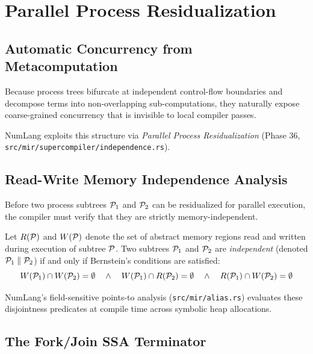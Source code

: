 \chapter{Parallel Process Residualization}
\label{chap:parallel}

\section{Automatic Concurrency from Metacomputation}
\label{sec:parallel:intro}

Because process trees bifurcate at independent control-flow boundaries and decompose terms into non-overlapping sub-computations, they naturally expose coarse-grained concurrency that is invisible to local compiler passes.

NumLang exploits this structure via \emph{Parallel Process Residualization} (Phase 36, \texttt{src/mir/supercompiler/independence.rs}).

\section{Read-Write Memory Independence Analysis}
\label{sec:parallel:independence}

Before two process subtrees $\mathcal{P}_1$ and $\mathcal{P}_2$ can be residualized for parallel execution, the compiler must verify that they are strictly memory-independent.

\begin{definition}
Let $R(\mathcal{P})$ and $W(\mathcal{P})$ denote the set of abstract memory regions read and written during execution of subtree $\mathcal{P}$. Two subtrees $\mathcal{P}_1$ and $\mathcal{P}_2$ are \emph{independent} (denoted $\mathcal{P}_1 \parallel \mathcal{P}_2$) if and only if Bernstein's conditions are satisfied:
\begin{equation}
W(\mathcal{P}_1) \cap W(\mathcal{P}_2) = \emptyset \quad \land \quad
W(\mathcal{P}_1) \cap R(\mathcal{P}_2) = \emptyset \quad \land \quad
R(\mathcal{P}_1) \cap W(\mathcal{P}_2) = \emptyset
\end{equation}
\end{definition}

NumLang's field-sensitive points-to analysis (\texttt{src/mir/alias.rs}) evaluates these disjointness predicates at compile time across symbolic heap allocations.

\section{The Fork/Join SSA Terminator}
\label{sec:parallel:terminator}


